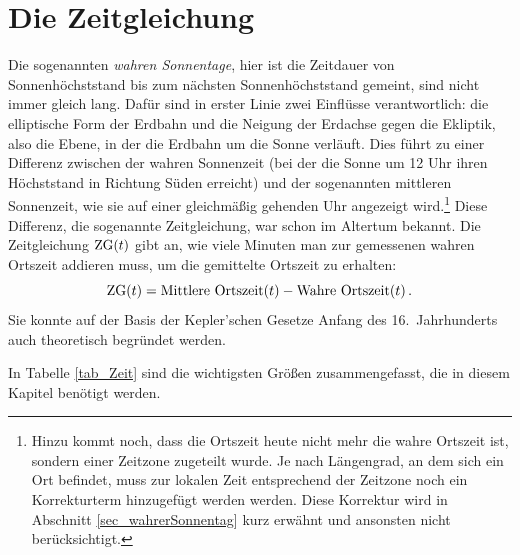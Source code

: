
\chapter{Die Zeitgleichung}
\label{chap_Zeitgleichung}

%
Die sogenannten \textit{wahren Sonnentage}, 
hier ist die Zeitdauer von Sonnenh\"ochststand bis zum n\"achsten Sonnenh\"ochststand
gemeint, sind nicht immer gleich lang. Daf\"ur sind in erster Linie zwei Einfl\"usse verantwortlich:
die elliptische Form der Erdbahn und die Neigung der Erdachse gegen die 
Ekliptik, also die Ebene, in der die Erdbahn um die Sonne verl\"auft. Dies f\"uhrt zu einer 
Differenz zwischen der wahren Sonnenzeit 
(bei der die Sonne um 12 Uhr ihren H\"ochststand
in Richtung S\"uden erreicht) und der sogenannten mittleren Sonnenzeit, wie sie auf einer 
gleichm\"a\ss ig gehenden Uhr angezeigt wird.\footnote{Hinzu kommt noch, dass die Ortszeit heute
nicht mehr die wahre Ortszeit ist, sondern einer Zeitzone zugeteilt wurde. Je nach L\"angengrad, an
dem sich ein Ort befindet, muss zur lokalen Zeit entsprechend der Zeitzone noch ein Korrekturterm
hinzugef\"ugt werden werden. Diese Korrektur wird in Abschnitt \ref{sec_wahrerSonnentag} kurz 
erw\"ahnt und ansonsten nicht ber\"ucksichtigt.}
Diese Differenz, die sogenannte Zeitgleichung, 
war schon im Altertum bekannt. Die Zeitgleichung ${\rm ZG}(t)$ gibt an, wie viele Minuten man zur gemessenen 
wahren Ortszeit addieren muss, um die gemittelte Ortszeit zu erhalten:
\begin{equation}
       {\rm ZG}(t) = \mbox{Mittlere Ortszeit}(t) - \mbox{Wahre Ortszeit}(t) \, .
\end{equation}
Sie konnte auf der Basis der Kepler'schen Gesetze Anfang des 16.\ Jahrhunderts auch theoretisch
begr\"undet werden. 

In Tabelle \ref{tab_Zeit} sind die wichtigsten Gr\"o\ss en zusammengefasst, die in diesem
Kapitel ben\"otigt werden.%

